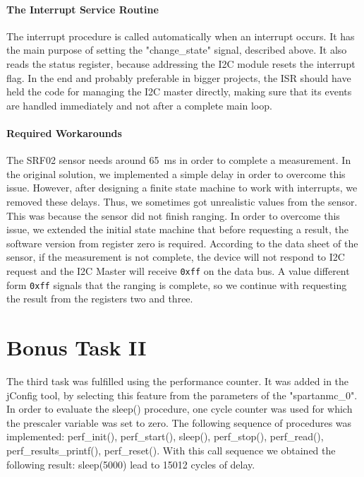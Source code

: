 			\paragraph{The Interrupt Service Routine} %
			\label{par:impl_isr}
				The interrupt procedure is called automatically when an interrupt occurs. It has the main purpose of setting the "change\_state" signal, described above. It also reads the status register, because addressing the I2C module resets the interrupt flag. In the end and probably preferable in bigger projects, the ISR should have held the code for managing the I2C master directly, making sure that its events are handled immediately and not after a complete main loop.

			\paragraph{Required Workarounds} %
			\label{par:required_workarounds}
				The SRF02 sensor needs around \SI{65}{\milli\second} in order to complete a measurement. In the original solution, we implemented a simple delay in order to overcome this issue. However, after designing a finite state machine to work with interrupts, we removed these delays. Thus, we sometimes got unrealistic values from the sensor. This was because the sensor did not finish ranging.
				In order to overcome this issue, we extended the initial state machine that before requesting a result, the software version from register zero is required. According to the data sheet of the sensor, if the measurement is not complete, the device will not respond to I2C request and the I2C Master will receive \texttt{0xff} on the data bus. A value different form \texttt{0xff} signals that the ranging is complete, so we continue with requesting the result from the registers two and three.


	\section{Bonus Task II} %
	\label{sec:impl_bonus_task_2}
		The third task was fulfilled using the performance counter. It was added in the jConfig tool, by selecting this feature from the parameters of the "spartanmc\_0". In order to evaluate the sleep() procedure, one cycle counter was used for which the prescaler variable was set to zero. The following sequence of procedures was implemented: perf\_init(\*), perf\_start(\*), sleep(\*), perf\_stop(\*), perf\_read(\*), perf\_results\_printf(\*), perf\_reset(). With this call sequence we obtained the following result: sleep(5000) lead to 15012 cycles of delay.

